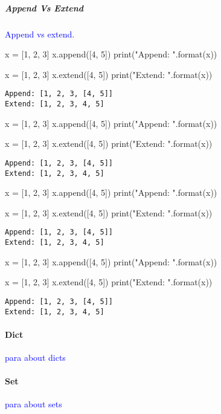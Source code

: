\subparagraph{Append Vs Extend}

\textcolor{blue}{Append vs extend.}

\begin{python}
x = [1, 2, 3]
x.append([4, 5])
print("Append: {}".format(x))

x = [1, 2, 3]
x.extend([4, 5])
print("Extend: {}".format(x))
\end{python}
\begin{lstlisting}[style=pyOutStyle]
Append: [1, 2, 3, [4, 5]]
Extend: [1, 2, 3, 4, 5]
\end{lstlisting}
\begin{python}
x = [1, 2, 3]
x.append([4, 5])
print("Append: {}".format(x))

x = [1, 2, 3]
x.extend([4, 5])
print("Extend: {}".format(x))
\end{python}
\begin{lstlisting}[style=pyOutStyle]
Append: [1, 2, 3, [4, 5]]
Extend: [1, 2, 3, 4, 5]
\end{lstlisting}
\begin{python}
x = [1, 2, 3]
x.append([4, 5])
print("Append: {}".format(x))

x = [1, 2, 3]
x.extend([4, 5])
print("Extend: {}".format(x))
\end{python}
\begin{lstlisting}[style=pyOutStyle]
Append: [1, 2, 3, [4, 5]]
Extend: [1, 2, 3, 4, 5]
\end{lstlisting}
\begin{python}
x = [1, 2, 3]
x.append([4, 5])
print("Append: {}".format(x))

x = [1, 2, 3]
x.extend([4, 5])
print("Extend: {}".format(x))
\end{python}
\begin{lstlisting}[style=pyOutStyle]
Append: [1, 2, 3, [4, 5]]
Extend: [1, 2, 3, 4, 5]
\end{lstlisting}


\paragraph{Dict}

\textcolor{blue}{para about dicts}

\paragraph{Set}

\textcolor{blue}{para about sets}


